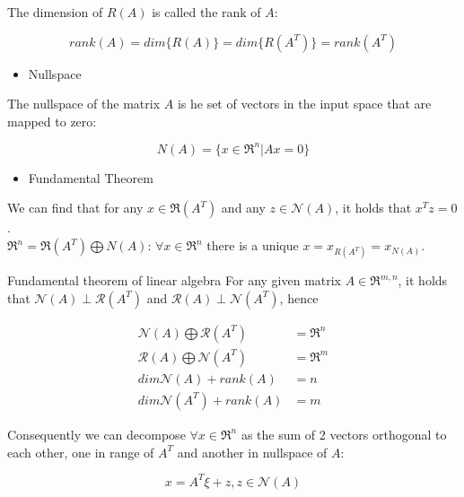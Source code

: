 The dimension of $R(A)$ is called the rank of $A$:

\begin{equation*}
rank(A) = dim\{R(A)\} = dim\{R(A^T)\} = rank(A^T)
\end{equation*}

\begin{itemize}
	\item Nullspace
\end{itemize}

The nullspace of the matrix $A$ is he set of vectors in the input space that are mapped to zero:

\begin{equation*}
N(A) = \{x\in \Re^n | Ax = 0\}
\end{equation*}

\begin{itemize}
	\item Fundamental Theorem
\end{itemize}

We can find that for any $x\in \Re(A^T)$ and any $z\in \mathcal{N}(A)$, it holds that $x^Tz = 0$.\\

$\Re^n = \Re(A^T) \bigoplus N(A)$: $\forall x\in \Re^n$ there is a unique $x = x_{R(A^T)} = x_{N(A)}$.\\

\begin{theorem}{Fundamental theorem of linear algebra}
	For any given matrix $A\in \Re^{m,n}$, it holds that $\mathcal{N}(A) \perp \mathcal{R}(A^T)$ and $\mathcal{R}(A) \perp \mathcal{N}(A^T)$, hence
	
	\begin{align*}
	\mathcal{N}(A) \bigoplus \mathcal{R}(A^T) &= \Re^n\\
	\mathcal{R}(A) \bigoplus \mathcal{N}(A^T) &= \Re^m\\
	dim \mathcal{N}(A) + rank(A) &=n\\
	dim \mathcal{N}(A^T) + rank(A) &=m
	\end{align*}
\end{theorem}

Consequently we can decompose $\forall x\in \Re^n$ as the sum of 2 vectors orthogonal to each other, one in range of $A^T$ and another in nullspace of $A$:

\begin{equation*}
x = A^T\xi + z, z\in \mathcal{N}(A)
\end{equation*}




